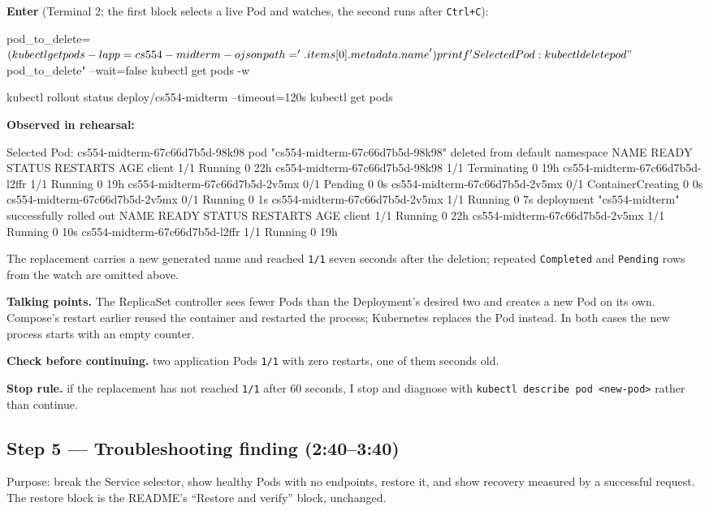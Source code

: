 \documentclass[11pt,letterpaper]{article}
\newcommand{\code}[1]{\texttt{#1}}
\newcommand{\talk}[1]{\begin{shaded*}\noindent\textbf{Talking points.} #1\end{shaded*}}
\newcommand{\enter}[1]{\par\noindent\textbf{Enter} (#1):\par}
\newcommand{\observed}{\par\noindent\textbf{Observed in rehearsal:}\par}
\newcommand{\checkpoint}[1]{\par\noindent\textbf{Check before continuing.} #1\par}
\newcommand{\stoprule}[1]{\par\noindent\textbf{Stop rule.} #1\par}
\begin{document}
\enter{Terminal 2; the first block selects a live Pod and watches, the second runs after \code{Ctrl+C}}
\begin{cmd}
pod_to_delete=$(kubectl get pods -l app=cs554-midterm -o jsonpath='{.items[0].metadata.name}')
printf 'Selected Pod: %
kubectl delete pod "$pod_to_delete" --wait=false
kubectl get pods -w
\end{cmd}
\begin{cmd}
kubectl rollout status deploy/cs554-midterm --timeout=120s
kubectl get pods
\end{cmd}
\observed
\begin{out}
Selected Pod: cs554-midterm-67c66d7b5d-98k98
pod "cs554-midterm-67c66d7b5d-98k98" deleted from default namespace
NAME                             READY   STATUS        RESTARTS   AGE
client                           1/1     Running       0          22h
cs554-midterm-67c66d7b5d-98k98   1/1     Terminating   0          19h
cs554-midterm-67c66d7b5d-l2ffr   1/1     Running       0          19h
cs554-midterm-67c66d7b5d-2v5mx   0/1     Pending       0          0s
cs554-midterm-67c66d7b5d-2v5mx   0/1     ContainerCreating   0          0s
cs554-midterm-67c66d7b5d-2v5mx   0/1     Running             0          1s
cs554-midterm-67c66d7b5d-2v5mx   1/1     Running             0          7s
deployment "cs554-midterm" successfully rolled out
NAME                             READY   STATUS    RESTARTS   AGE
client                           1/1     Running   0          22h
cs554-midterm-67c66d7b5d-2v5mx   1/1     Running   0          10s
cs554-midterm-67c66d7b5d-l2ffr   1/1     Running   0          19h
\end{out}
The replacement carries a new generated name and reached \code{1/1} seven seconds after the deletion; repeated \code{Completed} and \code{Pending} rows from the watch are omitted above.
\talk{The ReplicaSet controller sees fewer Pods than the Deployment's desired two and creates a new Pod on its own. Compose's restart earlier reused the container and restarted the process; Kubernetes replaces the Pod instead. In both cases the new process starts with an empty counter.}
\checkpoint{two application Pods \code{1/1} with zero restarts, one of them seconds old.}
\stoprule{if the replacement has not reached \code{1/1} after 60 seconds, I stop and diagnose with \code{kubectl describe pod <new-pod>} rather than continue.}

\subsection*{Step 5 --- Troubleshooting finding (2:40--3:40)}
Purpose: break the Service selector, show healthy Pods with no endpoints, restore it, and show recovery measured by a successful request. The restore block is the README's ``Restore and verify'' block, unchanged.
\end{document}

